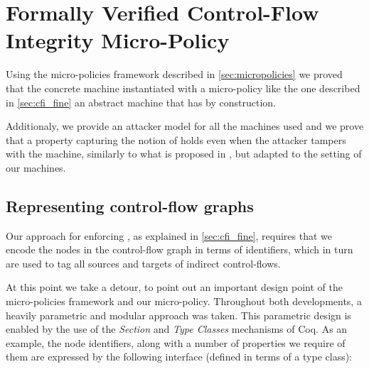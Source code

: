\chapter{Formally Verified Control-Flow Integrity Micro-Policy}\label{ch:verified_cfi}


Using the micro-policies framework described in \ref{sec:micropolicies} we 
proved that the concrete machine instantiated with a \CFI micro-policy like the
one described in \ref{sec:cfi_fine}  an abstract machine that has
\CFI by construction.

Additionaly, we provide an attacker model for all the machines used and we prove
that a property capturing the notion of \CFI holds even when the attacker
tampers with the machine, similarly to what is proposed in \cite{abadi2005}, but
adapted to the setting of our machines.

\section{Representing control-flow graphs}\label{sec:cfi_tags}

Our approach for enforcing \CFI, as explained in \ref{sec:cfi_fine}, requires
that we encode the nodes in the control-flow graph in terms of identifiers,
which in turn are used to tag all sources and targets of indirect control-flows.

At this point we take a detour, to point out an important design point of 
the micro-policies framework and our \CFI micro-policy.
Throughout both developments, a heavily parametric and modular approach was 
taken. This parametric design is enabled by the use of the \emph{Section} and
\emph{Type Classes} mechanisms of Coq. As an example, the node identifiers,
along with a number of properties we require of them are expressed by the
following interface (defined in terms of a type class):

